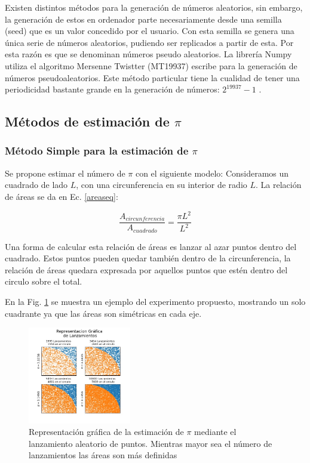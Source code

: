 \documentclass{rbf}
\begin{document}
Existen distintos métodos para la generación de números aleatorios, sin embargo, la generación de estos en ordenador parte necesariamente desde una semilla (seed) que es un valor concedido por el usuario. Con esta semilla se genera una única serie de números aleatorios, pudiendo ser replicados a partir de esta. Por esta razón es que se denominan números pseudo aleatorios.
La librería Numpy utiliza el algoritmo Mersenne Twistter (MT19937) escribe \cite{tan} para la generación de números pseudoaleatorios. Este método particular tiene la cualidad de tener una periodicidad bastante grande en la generación de números: $2^19937-1$ \cite{mako}.

\subsection{Métodos de estimación de $\pi$}
\subsubsection{Método Simple para la estimación de $\pi$}

Se propone estimar el número de $\pi$ con el siguiente modelo:
Consideramos un cuadrado de lado $L$, con una circunferencia en su interior de radio $L$.
La relación de áreas se da en Ec. \ref{areaseq}:

\begin{equation}
	\frac{A_{circunferencia}}{A_{cuadrado}}=\frac{\pi L^2}{L^2}
\label{areaseq}	
\end{equation}

Una forma de calcular esta relación de áreas es lanzar al azar puntos dentro del cuadrado. Estos puntos pueden quedar también dentro de la circunferencia, la relación de áreas quedara expresada por aquellos puntos que estén dentro del circulo sobre el total.

En la Fig. \ref{area} se muestra un ejemplo del experimento propuesto, mostrando un solo cuadrante ya que las áreas son simétricas en cada eje.

\begin{figure}[htbp!]
 \centering
  \includegraphics[width=0.4\textwidth]{figures/areas.jpg}
	\caption{Representación gráfica de la estimación de $\pi$ mediante el lanzamiento aleatorio de puntos. Mientras mayor sea el número de lanzamientos las áreas son más definidas}
 \label{area}
\end{figure}
\end{document}
